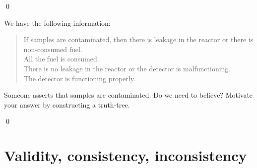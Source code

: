 \documentclass[11pt]{article}
\begin{document}
\begin{itemize}
\begin{uexercise}
\qed
\end{uexercise}

\begin{uexercise}\label{treeconsfol}
We have the following information:

\begin{quote}\small
If samples are contaminated, then there is leakage in the reactor or there is
non-consumed fuel.\\ 
All the fuel is consumed.\\
There is no leakage in the reactor or the detector is malfunctioning.\\
The detector is functioning properly.

\end{quote}

Someone asserts that samples are contaminated. Do we need to believe? Motivate
your answer by constructing a truth-tree.

\qed
\end{uexercise}
\hrulefill
\end{itemize}
	
\section{Validity, consistency, inconsistency}
\end{document}
